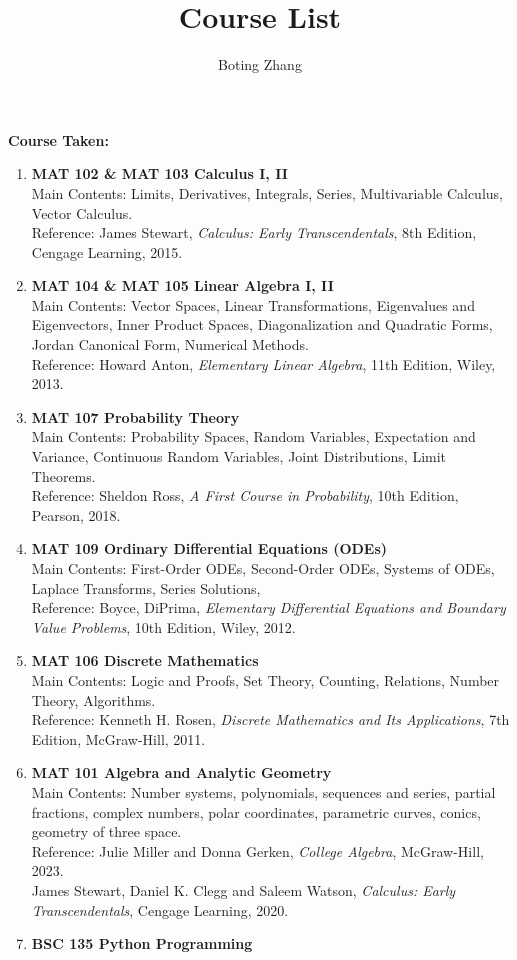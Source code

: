 \documentclass{scrartcl}
\begin{document}
\title{Course List} 
\author{Boting Zhang}
\date{}
\maketitle

\textbf{Course Taken:}
\begin{enumerate}
    \item \textbf{MAT 102 \& MAT 103 Calculus I, II}
    \\Main Contents: Limits, Derivatives, Integrals, Series, Multivariable Calculus, Vector Calculus.
    \\Reference: James Stewart, \textit{Calculus: Early Transcendentals}, 8th Edition, Cengage Learning, 2015.
    \item \textbf{MAT 104 \& MAT 105 Linear Algebra I, II}
    \\Main Contents: Vector Spaces, Linear Transformations, Eigenvalues and Eigenvectors, 
    Inner Product Spaces, Diagonalization and Quadratic Forms, Jordan Canonical Form, Numerical Methods.
    \\Reference: Howard Anton, \textit{Elementary Linear Algebra}, 11th Edition, Wiley, 2013.
    \item \textbf{MAT 107 Probability Theory}
    \\Main Contents: Probability Spaces, Random Variables, Expectation and Variance, Continuous Random Variables, 
    Joint Distributions, Limit Theorems.
    \\Reference: Sheldon Ross, \textit{A First Course in Probability}, 10th Edition, Pearson, 2018.
    \item \textbf{MAT 109 Ordinary Differential Equations (ODEs)}
    \\Main Contents: First-Order ODEs, Second-Order ODEs, Systems of ODEs, Laplace Transforms, Series Solutions,
    \\Reference: Boyce, DiPrima, \textit{Elementary Differential Equations and Boundary Value Problems}, 10th Edition, Wiley, 2012.
    \item \textbf{MAT 106 Discrete Mathematics}
    \\Main Contents: Logic and Proofs, Set Theory, Counting, Relations, Number Theory, Algorithms.
    \\Reference: Kenneth H. Rosen, \textit{Discrete Mathematics and Its Applications}, 7th Edition, McGraw-Hill, 2011.
    \item \textbf{MAT 101 Algebra and Analytic Geometry}
    \\Main Contents: Number systems, polynomials, sequences and series, partial 
    fractions, complex numbers, polar coordinates, parametric curves, conics, 
    geometry of three space.
    \\Reference: Julie Miller and Donna Gerken, \textit{College Algebra}, McGraw-Hill, 2023.
    \\James Stewart, Daniel K. Clegg and Saleem Watson, \textit{Calculus: Early Transcendentals}, Cengage Learning, 2020. 
    \item \textbf{BSC 135 Python Programming}
\end{enumerate}
\newpage
\end{document}
